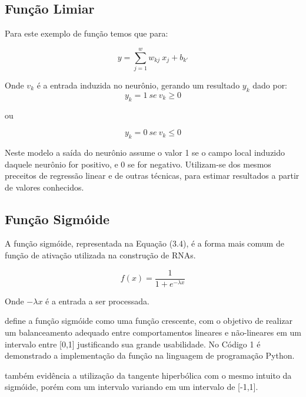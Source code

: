 \subsection{Função Limiar}
Para este exemplo de função temos que para:
 
\begin{equation}\label{eq:limiar}
y=\sum_{j=1}^{w} w_{kj}\ x_j + b_{k'}
\end{equation}

Onde $v_k$ é a entrada induzida no neurônio, gerando um resultado $y_k$ dado por:
\begin{equation}\label{eq:limiar-result} 
y_k = {1\ se\ v_k  \geq 0}
\end{equation}

ou

\begin{equation}\label{eq:limiar-result} 
y_k = {0\ se\ v_k \leq 0}  
\end{equation}

Neste modelo a saída do neurônio assume o valor 1 se o campo local induzido daquele neurônio for positivo, e 0 se for negativo. Utilizam-se dos mesmos preceitos de regressão linear e de outras técnicas, para estimar resultados a partir de valores conhecidos.

\subsection{Função Sigmóide}
A função sigmóide, representada na Equação (3.4), é a forma mais comum de função de ativação utilizada na construção de RNAs.

\begin{equation}\label{eq:limiar-result} 
f(x)=\frac{1}{1+e^{- \lambda x}}
\end{equation}

Onde $- \lambda x$ é a entrada a ser processada.

 define a função sigmóide como uma função crescente, com o  objetivo de realizar um balanceamento adequado entre comportamentos lineares e não-lineares em um intervalo entre [0,1] justificando sua grande usabilidade. No Código 1 é demonstrado a implementação da função na linguagem de programação Python.

 também evidência a utilização da tangente hiperbólica com o mesmo intuito da sigmóide, porém com um intervalo variando em um intervalo de [-1,1].

\codigoPython\


